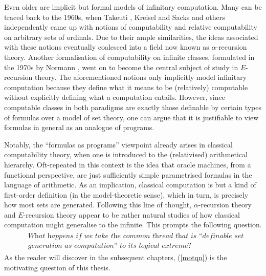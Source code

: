 \documentclass[12pt, twoside]{memoir}
\numberwithin{equation}{section}
\theoremstyle{definition}
\theoremstyle{remark}
\theoremstyle{definition}
\theoremstyle{definition}
\theoremstyle{definition}
\theoremstyle{remark}
\begin{document}
Even older are implicit but formal models of infinitary computation. Many can be traced back to the 1960s, when Takeuti \cite{takeuti}, Kreisel and Sacks \cite{kreiselsacks} and others independently came up with notions of computability and relative computability on arbitrary sets of ordinals. Due to their ample similarities, the ideas associated with these notions eventually coalesced into a field now known as $\alpha$-recursion theory. Another formalisation of computability on infinite classes, formulated in the 1970s by Normann \cite{normann}, went on to become the central subject of study in $E$-recursion theory. The aforementioned notions only implicitly model infinitary computation because they define what it means to be (relatively) computable without explicitly defining what a computation entails. However, since computable classes in both paradigms are exactly those definable by certain types of formulas over a model of set theory, one can argue that it is justifiable to view formulas in general as an analogue of programs. 

Notably, the ``formulas as programs'' viewpoint already arises in classical computability theory, when one is introduced to the (relativised) arithmetical hierarchy. Oft-repeated in this context is the idea that oracle machines, from a functional perspective, are just sufficiently simple parametrised formulas in the language of arithmetic. As an implication, classical computation is but a kind of first-order definition (in the model-theoretic sense), which in turn, is precisely how most sets are generated. Following this line of thought, $\alpha$-recursion theory and $E$-recursion theory appear to be rather natural studies of how classical computation might generalise to the infinite. This prompts the following question.
\begin{align}\label{motqn}
\begin{split}
    & \textit{What happens if we take the common thread that is ``definable set} \\ 
    & \textit{generation as computation'' to its logical extreme?}
\end{split}
\end{align}
As the reader will discover in the subsequent chapters, (\ref{motqn}) is the motivating question of this thesis.
\end{document}
